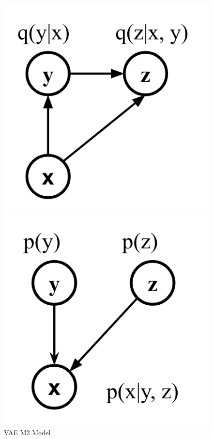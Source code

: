 \begin{figure}[H]
	\centering
	\begin{minipage}{0.4\columnwidth}
		\centering
		\includegraphics[clip, width=\linewidth]{fig/chapter2/discriminative_vae}
	\end{minipage}
	\begin{minipage}{0.4\columnwidth}
		\centering
		\includegraphics[clip, width=\linewidth]{fig/chapter2/generative_vae}
	\end{minipage}
	\caption{VAE M2 Model}
	\label{fig:vae_m2}
\end{figure}

